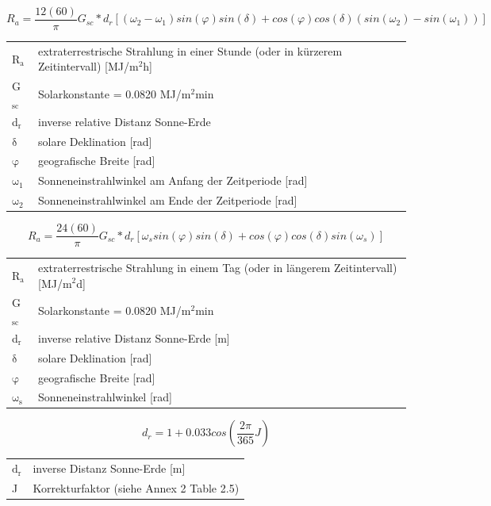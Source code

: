 \begin{description}
\begin{equation}
\label{eq:Ra_short_period}
R_{a}=\frac{12 (60)}{\pi}G_{sc}*d_{r}[(\omega _{2}-\omega _{1})sin(\varphi)sin(\delta)+cos(\varphi)cos(\delta)(sin(\omega _{2})- sin(\omega _{1}))]
\end{equation}
\begin{table}[H]
\centering
\begin{tabular}{ll}
R$\mathrm{_{a}}$ & extraterrestrische Strahlung in einer Stunde (oder in kürzerem Zeitintervall) [MJ/m$\mathrm{^{2}}$h]\\
G$\mathrm{_{sc}}$ & Solarkonstante = 0.0820 MJ/m$\mathrm{^{2}}$min\\
d$\mathrm{_{r}}$ & inverse relative Distanz Sonne-Erde\\
$\mathrm{\delta}$ & solare Deklination [rad]\\
$\mathrm{\varphi}$ & geografische Breite [rad]\\
$\mathrm{\omega_{1}}$ & Sonneneinstrahlwinkel am Anfang der Zeitperiode [rad]\\
$\mathrm{\omega_{2}}$ & Sonneneinstrahlwinkel am Ende der Zeitperiode [rad]\\
\end{tabular}
\end{table}

\begin{equation}
\label{eq:Ra_long_period}
R_{a}=\frac{24 (60)}{\pi}G_{sc}*d_{r}[\omega _{s}sin(\varphi)sin(\delta)+cos(\varphi)cos(\delta)sin(\omega _{s})]
\end{equation}
\begin{table}[H]
\centering
\begin{tabular}{ll}
R$\mathrm{_{a}}$ & extraterrestrische Strahlung in einem Tag (oder in längerem Zeitintervall) [MJ/m$\mathrm{^{2}}$d]\\
G$\mathrm{_{sc}}$ & Solarkonstante = 0.0820 MJ/m$\mathrm{^{2}}$min\\
d$\mathrm{_{r}}$ & inverse relative Distanz Sonne-Erde [m]\\
$\mathrm{\delta}$ & solare Deklination [rad]\\
$\mathrm{\varphi}$ & geografische Breite [rad]\\
$\mathrm{\omega_{s}}$ & Sonneneinstrahlwinkel [rad]\\
\end{tabular}
\end{table}

\begin{equation}
\label{eq:dr}
d_r=1+0.033cos\left(\frac{2\pi}{365}J\right)
\end{equation}
\begin{table}[H]
\centering
\begin{tabular}{ll}
$\mathrm{d_r}$ & inverse Distanz Sonne-Erde [m]\\
J & Korrekturfaktor (siehe \cite{fao} Annex 2 Table 2.5)\\
\end{tabular}
\end{table}


\end{description}
